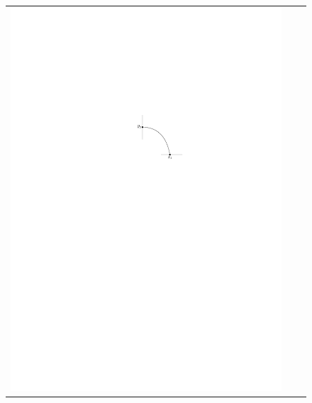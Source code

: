 \documentclass{patmorin}
\begin{document}
\begin{figure}
   \begin{center}
     \begin{tabular}{ccc}
       \includegraphics{figs/silly-1} &

\end{tabular}
\end{center}
\end{figure}
\end{document}
